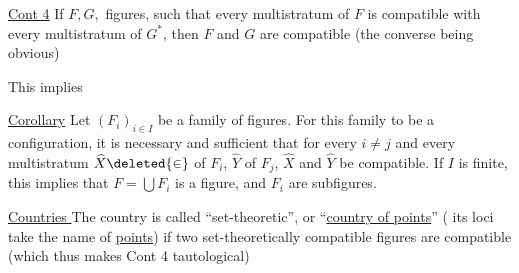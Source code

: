 \uline{Cont 4} If $F,G,$  figures, such that every multistratum of $F$ is compatible with every multistratum of $G^{*}$, then $F$ and $G$ are compatible (the converse being obvious)


\deleted{\uline{Corollary} If $F,G,H$ are \unsure{. all|. three} $(\unsure{F_i|F_j}]$}

 This implies

\uline{Corollary} Let $(F_i)_{i\in I}$ be a family  of figures. For  this family to be a configuration, it is necessary and sufficient that for every $i\ne j$ and every multistratum $\widehat{X}\deleted{\in}$ of $F_i$, $\widehat{Y}$ of $F_j$, $\widehat{X}$ and $\widehat{Y}$ be compatible. If $I$ is finite, this implies that $F=\bigcup F_i$ is a figure, and  $F_i$  are subfigures.


\uline{Countries } The country is called ``set-theoretic'', or ``\uline{country of points}'' ( its loci take the name of \uline{points}) if two set-theoretically compatible figures are compatible (which thus makes Cont 4 tautological)
